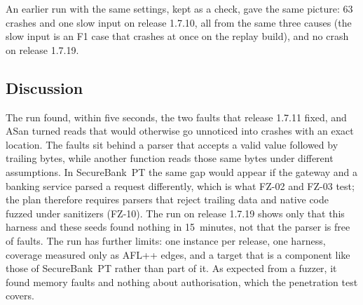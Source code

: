 An earlier run with the same settings, kept as a check, gave the same
picture: 63 crashes and one slow input on release 1.7.10, all from the
same three causes (the slow input is an F1 case that crashes at once on
the replay build), and no crash on release 1.7.19.

\subsection{Discussion}

The run found, within five seconds, the two faults that release 1.7.11
fixed, and \ac{ASan} turned reads that would otherwise go unnoticed into
crashes with an exact location. The faults sit behind a parser that
accepts a valid value followed by trailing bytes, while another function
reads those same bytes under different assumptions. In SecureBank~PT
the same gap would appear if the gateway and a banking service parsed a
request differently, which is what FZ-02 and FZ-03 test; the plan
therefore requires parsers that reject trailing data and native code
fuzzed under sanitizers (FZ-10). The run on release 1.7.19 shows only
that this harness and these seeds found nothing in 15~minutes, not that
the parser is free of faults. The run has further limits: one instance
per release, one harness, coverage measured only as AFL++ edges, and a
target that is a component like those of SecureBank~PT rather than part
of it. As expected from a fuzzer, it found memory faults and nothing
about authorisation, which the penetration test covers.
